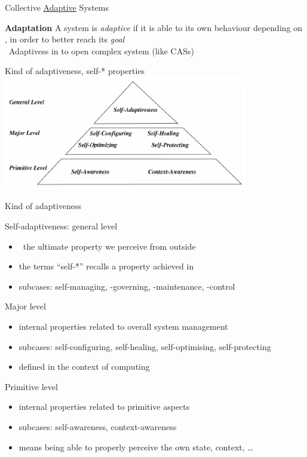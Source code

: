 \documentclass[presentation, 8pt]{beamer}\mode<presentation>{\usetheme{AMSBolognaFC}}
\begin{document}
\begin{frame}{Collective \underline{Adaptive} Systems}
\begin{alertblock}{\textbf{Adaptation}}
A system is \emph{adaptive} if it is able to  its own behaviour
depending on , in order to better reach its \emph{goal}\\
\faArrowRight \, Adaptivess in  to open complex system (like CASs)
\end{alertblock}
\begin{exampleblock}{Kind of adaptiveness, self-* properties}
	\centering
	\includegraphics[width=0.8\textwidth]{img/self-*.png}
\end{exampleblock}
\end{frame}
\begin{frame}{Kind of adaptiveness}
\begin{exampleblock}{Self-adaptiveness: general level}
	\begin{itemize}
		\item {} \faArrowRight \, the ultimate property we perceive from outside
		\item the terms ``self-*'' recalls a property achieved in 
		\item subcases: self-managing, -governing, -maintenance, -control
	\end{itemize}
\end{exampleblock}
\begin{exampleblock}{Major level}
	\begin{itemize}
		\item internal properties related to overall system management
		\item subcases: self-configuring, self-healing, self-optimising, self-protecting
		\item defined in the context of  computing
	\end{itemize}
\end{exampleblock}
\begin{exampleblock}{Primitive level}
	\begin{itemize}
		\item internal properties related to primitive aspects
		\item subcases: self-awareness, context-awareness
		\item means being able to properly perceive the own state, context, \dots
	\end{itemize}
\end{exampleblock}
\end{frame}
\end{document}
